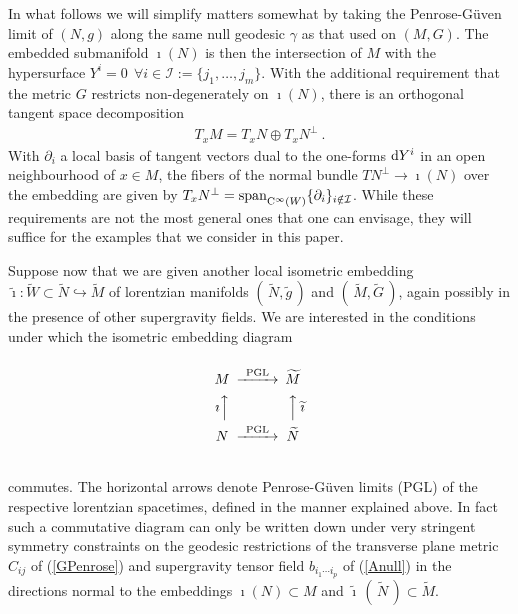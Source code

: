 \documentclass[11pt,a4paper]{article}
\def\dd{{\rm d}}
\newcommand{\beq}{\begin{eqnarray}}
\newcommand{\eeq}{\end{eqnarray}}
\begin{document}
In what follows we will simplify matters somewhat by taking the Penrose-G\"uven
limit of $(N,g)$ along the same null geodesic $\gamma$ as that used on
$(M,G)$. The embedded submanifold $\imath(N)$ is then the intersection of
$M$ with the hypersurface $Y^i=0~~\forall i\in{\mathcal
  I}:=\{j_1,\dots,j_m\}$. With the additional requirement that the metric $G$
restricts non-degenerately on $\imath(N)$, there is an orthogonal
tangent space decomposition
\beq
T_xM=T_xN\oplus T_xN^\perp \ .
\label{taudecomp}\eeq
With $\partial_i$ a local basis of tangent vectors dual to the one-forms
$\dd Y^i$ in an open neighbourhood of $x\in M$, the fibers of the
normal bundle $TN^\perp\to\imath(N)$ over the embedding are given by
$T_xN^\perp={\rm span}_{{\rm
    C}^\infty(W)}^{~}\{\partial_i\}_{i\notin{\mathcal I}}$. While
these requirements are not the most general ones that one can
envisage, they will suffice for the examples that we consider in this
paper.

Suppose now that we are given another local isometric embedding
$\widetilde{\imath}:\widetilde{W}\subset\widetilde{N}\hookrightarrow\widetilde{M}$ of
lorentzian manifolds $(\,\widetilde{N},\widetilde{g}\,)$ and
$(\,\widetilde{M},\widetilde{G}\,)$, again possibly in the presence of
other supergravity fields. We are interested in the conditions under
which the isometric embedding diagram
\begin{equation}
  \begin{CD}
    @.\\
    M @>\text{PGL}>>                      \widetilde{M}\\
    \text{$\imath$}@AAA @AAA\text{$\widetilde{\imath}$}\\
    N @>\text{PGL}>>                      \widetilde{N}\\
    @.
  \end{CD}
\label{isomembdiag}\end{equation}
commutes. The horizontal arrows denote Penrose-G\"uven limits (PGL) of
the respective lorentzian spacetimes, defined in the manner explained
above. In fact such a commutative diagram can only be written down
under very stringent symmetry constraints on the geodesic restrictions
of the transverse plane metric $C_{ij}$ of (\ref{GPenrose}) and
supergravity tensor field $b_{i_1\cdots i_p}$ of
(\ref{Anull}) in the directions normal to the embeddings
$\imath(N)\subset M$ and
$\widetilde{\imath}\,(\,\widetilde{N}\,)\subset\widetilde{M}$.
\end{document}
